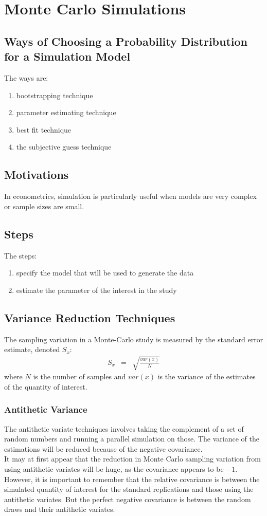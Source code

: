\chapter{Monte Carlo Simulations}

\section{Ways of Choosing a Probability Distribution for a Simulation Model}
The ways are:
\begin{enumerate}
	\item bootstrapping technique
	\item parameter estimating technique
	\item best fit technique
	\item the subjective guess technique
\end{enumerate}


\section{Motivations}
In econometrics, simulation is particularly useful when models are very complex or sample sizes are small.

\section{Steps}
The steps:
\begin{enumerate}
	\item specify the model that will be used to generate the data
	\item estimate the parameter of the interest in the study
\end{enumerate}

\section{Variance Reduction Techniques}
The sampling variation in a Monte-Carlo study is measured by the standard error estimate, denoted $S_{x}$:
\begin{eqnarray}
	S_{x} &=& \sqrt{\frac{var(x)}{N}}
\end{eqnarray}
where $N$ is the number of samples and $var(x)$ is the variance of the estimates of the quantity of interest.

\subsection{Antithetic Variance}
The antithetic variate techniques involves taking the complement of a set of random numbers and running a parallel simulation on those. The variance of the estimations will be reduced because of the negative covariance.\\
It may at first appear that the reduction in Monte Carlo sampling variation from using antithetic variates will be huge, as the covariance appears to be $-1$.\\
However, it is important to remember that the relative covariance is between the simulated quantity of interest for the standard replications and those using the antithetic variates. But the perfect negative covariance is between the random draws and their antithetic variates.

